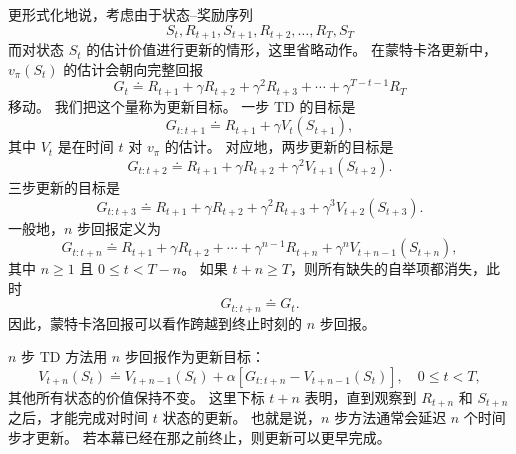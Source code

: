 \documentclass[UTF8, 12pt, fontset=fandol, oneside]{ctexart}
\begin{document}
更形式化地说，考虑由于状态--奖励序列
\[
S_t,R_{t+1},S_{t+1},R_{t+2},\ldots,R_T,S_T
\]
而对状态 $S_t$ 的估计价值进行更新的情形，这里省略动作。
在蒙特卡洛更新中，$v_\pi(S_t)$ 的估计会朝向完整回报
\[
G_t \doteq R_{t+1}+\gamma R_{t+2}+\gamma^2R_{t+3}+\cdots+\gamma^{T-t-1}R_T
\]
移动。
我们把这个量称为更新目标。
一步 TD 的目标是
\[
G_{t:t+1}\doteq R_{t+1}+\gamma V_t(S_{t+1}),
\]
其中 $V_t$ 是在时间 $t$ 对 $v_\pi$ 的估计。
对应地，两步更新的目标是
\[
G_{t:t+2}\doteq R_{t+1}+\gamma R_{t+2}+\gamma^2 V_{t+1}(S_{t+2}).
\]
三步更新的目标是
\[
G_{t:t+3}\doteq R_{t+1}+\gamma R_{t+2}+\gamma^2R_{t+3}+\gamma^3V_{t+2}(S_{t+3}).
\]
一般地，$n$ 步回报定义为
\begin{equation}
G_{t:t+n}\doteq R_{t+1}+\gamma R_{t+2}+\cdots+\gamma^{n-1}R_{t+n}
        +\gamma^n V_{t+n-1}(S_{t+n}),
\tag{7.1}
\end{equation}
其中 $n\ge 1$ 且 $0\le t<T-n$。
如果 $t+n\ge T$，则所有缺失的自举项都消失，此时
\[
G_{t:t+n}\doteq G_t.
\]
因此，蒙特卡洛回报可以看作跨越到终止时刻的 $n$ 步回报。

$n$ 步 TD 方法用 $n$ 步回报作为更新目标：
\begin{equation}
V_{t+n}(S_t)\doteq V_{t+n-1}(S_t)
 +\alpha\left[G_{t:t+n}-V_{t+n-1}(S_t)\right],
\quad 0\le t<T,
\tag{7.2}
\end{equation}
其他所有状态的价值保持不变。
这里下标 $t+n$ 表明，直到观察到 $R_{t+n}$ 和 $S_{t+n}$ 之后，才能完成对时间 $t$ 状态的更新。
也就是说，$n$ 步方法通常会延迟 $n$ 个时间步才更新。
若本幕已经在那之前终止，则更新可以更早完成。
\end{document}
